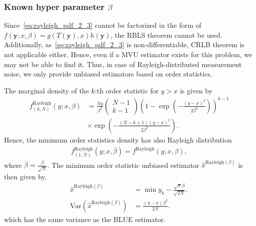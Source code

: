 \documentclass[journal]{IEEEtran}
\newcommand{\Var}{\mathrm{Var}}
\begin{document}
\subsubsection{Known hyper parameter $\beta$}
Since~\eqref{eq:rayleigh_pdf_2_3} cannot be factorized in the form of $f(\bm{y};x,\beta) = g(T(\bm{y}),x)h(\bm{y})$, the RBLS theorem cannot be used. Additionally, as~\eqref{eq:rayleigh_pdf_2_3} is non-differentiable, CRLB theorem is not applicable either. Hence, even if a MVU estimator exists for this problem, we may not be able to find it. Thus, in case of Rayleigh-distributed measurement noise, we only provide unbiased estimators based on order statistics. 

The marginal density of the $k$:th order statistic for $y>x$ is given by
%
%
\begin{align}
f^{\mathrm{Rayleigh}}_{(k,N)}(y;x,\beta) &=
\frac{Ny}{\beta^2}\begin{pmatrix}N-1\\k-1\end{pmatrix}\left(1-\exp(-\frac{(y-x)^2}{2\beta^2})\right)^{k-1}\nonumber\\&\times\exp\left(-\frac{(N-k+1)(y-x)^2}{2\beta^2}\right).
\label{eq:rayleigh_order}
\end{align}
%
%
Hence, the minimum order statistics density has also Rayleigh distribution 
%
%
\begin{align}
f^{\mathrm{Rayleigh}}_{(1,N)}(y;x,\bar{\beta}) = f^{\mathrm{Rayleigh}}(y;x,\beta),
\end{align}
%
%
where $\bar{\beta}=\frac{\beta}{\sqrt{N}}$.  The minimum order statistic unbiased estimator $\hat{x}^{\mathrm{Rayleigh}(\beta)}$ is then given by,
%
%
\begin{subequations}
\begin{align}
\hat{x}^{\mathrm{Rayleigh}(\beta)} &= \min y_k - \frac{\sqrt{\pi}\beta}{\sqrt{2N}},
\\ 
\Var(\hat{x}^{\mathrm{Rayleigh}(\beta)}) &=\frac{(4-\pi)\beta^2}{2N}.
\end{align}
\end{subequations}
%
%
which has the same variance as the BLUE estimator.
\end{document}
